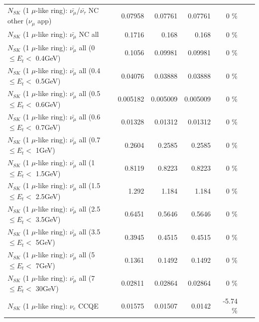 \begin{table}
\begin{tabular}{| l | r | r | r  r | r  r |}
$N_{SK}$ (1 $\mu$-like ring): $\bar{\nu_\mu}$/$\bar{\nu_\tau}$ NC other ($\nu_\mu$ app) &         0.07958 &        0.07761 &        0.07761 &       0 \%  & & \\
                          $N_{SK}$ (1 $\mu$-like ring): $\bar{\nu_{\mu}}$ NC all &          0.1716 &          0.168 &          0.168 &       0 \%  & & \\
\hline
   $N_{SK}$ (1 $\mu$-like ring): $\bar{\nu_{\mu}}$ all (0 $\leq E_{t} <$ 0.4GeV) &          0.1056 &        0.09981 &        0.09981 &       0 \%  & & \\
 $N_{SK}$ (1 $\mu$-like ring): $\bar{\nu_{\mu}}$ all (0.4 $\leq E_{t} <$ 0.5GeV) &         0.04076 &        0.03888 &        0.03888 &       0 \%  & & \\
 $N_{SK}$ (1 $\mu$-like ring): $\bar{\nu_{\mu}}$ all (0.5 $\leq E_{t} <$ 0.6GeV) &        0.005182 &       0.005009 &       0.005009 &       0 \%  & & \\
 $N_{SK}$ (1 $\mu$-like ring): $\bar{\nu_{\mu}}$ all (0.6 $\leq E_{t} <$ 0.7GeV) &         0.01328 &        0.01312 &        0.01312 &       0 \%  & & \\
   $N_{SK}$ (1 $\mu$-like ring): $\bar{\nu_{\mu}}$ all (0.7 $\leq E_{t} <$ 1GeV) &          0.2604 &         0.2585 &         0.2585 &       0 \%  & & \\
   $N_{SK}$ (1 $\mu$-like ring): $\bar{\nu_{\mu}}$ all (1 $\leq E_{t} <$ 1.5GeV) &          0.8119 &         0.8223 &         0.8223 &       0 \%  & & \\
 $N_{SK}$ (1 $\mu$-like ring): $\bar{\nu_{\mu}}$ all (1.5 $\leq E_{t} <$ 2.5GeV) &           1.292 &          1.184 &          1.184 &       0 \%  & & \\
 $N_{SK}$ (1 $\mu$-like ring): $\bar{\nu_{\mu}}$ all (2.5 $\leq E_{t} <$ 3.5GeV) &          0.6451 &         0.5646 &         0.5646 &       0 \%  & & \\
   $N_{SK}$ (1 $\mu$-like ring): $\bar{\nu_{\mu}}$ all (3.5 $\leq E_{t} <$ 5GeV) &          0.3945 &         0.4515 &         0.4515 &       0 \%  & & \\
     $N_{SK}$ (1 $\mu$-like ring): $\bar{\nu_{\mu}}$ all (5 $\leq E_{t} <$ 7GeV) &          0.1361 &         0.1492 &         0.1492 &       0 \%  & & \\
    $N_{SK}$ (1 $\mu$-like ring): $\bar{\nu_{\mu}}$ all (7 $\leq E_{t} <$ 30GeV) &         0.02811 &        0.02864 &        0.02864 &       0 \%  & & \\
\hline
\hline
\hline
                                      $N_{SK}$ (1 $\mu$-like ring): $\nu_e$ CCQE &         0.01575 &        0.01507 &         0.0142 &   -5.74 \%  & & \\

\end{tabular}
\end{table}
